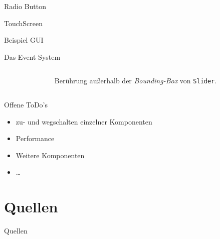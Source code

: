 \documentclass[12pt, aspectratio=169]{beamer}
\begin{document}
	\begin{frame}{Radio Button}
		\centering
	\end{frame}

	\begin{frame}{TouchScreen}
		\centering\scalebox{0.8}{
			\begin{tikzpicture}
				
			\end{tikzpicture}
		}
	\end{frame}

	\begin{frame}{Beispiel GUI}
		\centering
	\end{frame}

	\begin{frame}{Das Event System}
		\begin{columns}
			\begin{column}{0.6\textwidth}
				
			\end{column}
			\begin{column}{0.4\textwidth}
				\pause
				Berührung außerhalb der \emph{Bounding-Box} von \texttt{Slider}.
			\end{column}
		\end{columns}
	\end{frame}
	
	\begin{frame}{Offene ToDo's}
		\begin{itemize}
			\item zu- und wegschalten einzelner Komponenten
			\item Performance
			\item Weitere Komponenten
			\item \dots
		\end{itemize}
	\end{frame}
	
	\section{Quellen}
	\begin{frame}{Quellen}
		\nocite{ts-holzinger}
		\nocite{I2C-spec_userManual}
		\nocite{stm32_refManual}
		\printbibliography
	\end{frame}
\end{document}
